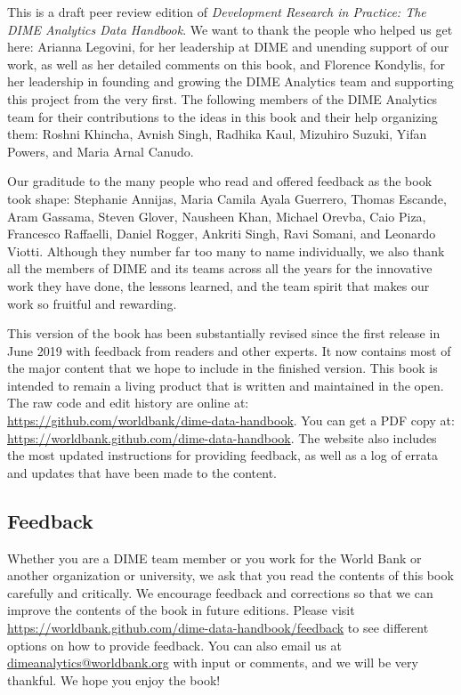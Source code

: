 This is a draft peer review edition of
\textit{Development Research in Practice:
The DIME Analytics Data Handbook}.
We want to thank the people who helped us get here:
Arianna Legovini, for her leadership at DIME and unending support of our work, 
as well as her detailed comments on this book, and 
Florence Kondylis, for her leadership in founding and growing the DIME Analytics team
and supporting this project from the very first.
The following members 
of the DIME Analytics team for their contributions 
to the ideas in this book and their help organizing them: 
Roshni Khincha, Avnish Singh, Radhika Kaul,
Mizuhiro Suzuki, Yifan Powers, and Maria Arnal Canudo.

Our graditude to the many people who read and offered feedback as the book took shape:
Stephanie Annijas,
Maria Camila Ayala Guerrero,
Thomas Escande,
Aram Gassama,
Steven Glover,
Nausheen Khan,
Michael Orevba,
Caio Piza,
Francesco Raffaelli,
Daniel Rogger,
Ankriti Singh,
Ravi Somani,
and Leonardo Viotti.
Although they number far too many to name individually, 
we also thank all the members of DIME and its teams across all the years
for the innovative work they have done, the lessons learned,
and the team spirit that makes our work so fruitful and rewarding.

This version of the book has been substantially revised
since the first release in June 2019
with feedback from readers and other experts.
It now contains most of the major content
that we hope to include in the finished version.
This book is intended to remain a living product
that is written and maintained in the open.
The raw code and edit history are online at:
\url{https://github.com/worldbank/dime-data-handbook}.
You can get a PDF copy at:
\url{https://worldbank.github.com/dime-data-handbook}.
The website also includes the most updated instructions
for providing feedback, as well as
a log of errata and updates that have been made to the content.

\subsection{Feedback}

Whether you are a DIME team member or you work for the World Bank
or another organization or university,
we ask that you read the contents of this book carefully and critically.
We encourage feedback and corrections
so that we can improve the contents of the book
in future editions. Please visit
\url{https://worldbank.github.com/dime-data-handbook/feedback} to
see different options on how to provide feedback.
You can also email us at \url{dimeanalytics@worldbank.org}
with input or comments, and we will be very thankful.
We hope you enjoy the book!
